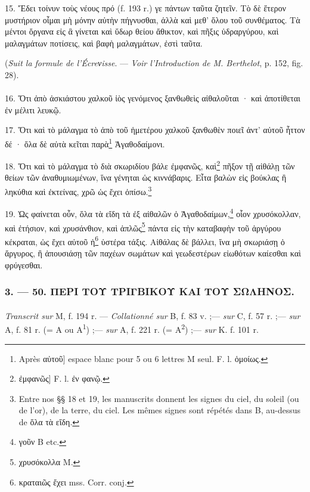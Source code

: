 \documentclass[landscape, a4paper, 11pt, oneside, polutonikogreek, french]{article}
\begin{document}
15. Ἔδει τοίνυν τοὺς νέους πρό (f. 193 r.) γε πάντων ταῦτα ζητεῖν. Τὸ δὲ ἕτερον μυστήριον οἶμαι μὴ μόνην αὐτὴν πήγνυσθαι, ἀλλὰ καὶ μεθ' ὅλου τοῦ συνθέματος. Τὰ μέντοι ὄργανα εἰς ἃ γίνεται καὶ ὕδωρ θείου ἄθικτον, καὶ πῆξις ὑδραργύρου, καὶ μαλαγμάτων ποτίσεις, καὶ βαφὴ μαλαγμάτων, ἐστὶ ταῦτα.
\begin{center}
(\emph{Suit la formule de l'Écreνisse}. --- \emph{Voir l'Introduction de M. Berthelot}, p. 152, fig. 28).
\end{center}
\paragraph{}
16. Ὅτι ἀπὸ ἀσκιάστου χαλκοῦ ἰὸς γενόμενος ξανθωθεὶς αἰθαλοῦται · καὶ ἀποτίθεται ἐν μέλιτι λευκῷ.

17. Ὅτι καὶ τὸ μάλαγμα τὸ ἀπὸ τοῦ ἡμετέρου χαλκοῦ ξανθωθὲν ποιεῖ ἀντ' αὐτοῦ       ἧττον δέ · ὅλα δὲ αὐτὰ κεῖται παρὰ\footnote{Après αὐτοῦ] espace blanc pour 5 ou 6 lettres M seul. F. l. ὁμοίως.} Ἀγαθοδαίμονι.

18. Ὅτι καὶ τὸ μάλαγμα τὸ διὰ σκωριδίου βάλε ἐμφανῶς, καὶ\footnote{ἐμφανῶς] F. l. ἐν φανῷ.} πῆξον τῇ αἰθάλῃ τῶν θείων τῶν ἀναθυμιωμένων, ἵνα γένηται ὡς κιννάβαρις. Εἶτα βαλὼν εἰς βούκλας ἢ ληκύθια καὶ ἐκτείνας, χρῶ ὡς ἔχει ὀπίσω.\footnote{Entre nos §§ 18 et 19, les manuscrits donnent les signes du ciel, du soleil (ou de l'or), de la terre, du ciel. Les mêmes signes sont répétés dans B, au-dessus de ὅλα τὰ εἴδη.}

19. Ὡς φαίνεται οὖν, ὅλα τὰ εἴδη τὰ ἐξ αἰθαλῶν ὁ Ἀγαθοδαίμων,\footnote{γοῦν B etc.} οἷον χρυσόκολλαν, καὶ ἐτήσιον, καὶ χρυσάνθιον, καὶ ἁπλῶς\footnote{χρυσόκολλα M.} πάντα εἰς τὴν καταβαφὴν τοῦ ἀργύρου κέκραται, ὡς ἔχει αὐτοῦ ἡ\footnote{κραταιῶς ἔχει mss. Corr. conj.} ὑστέρα τάξις. Αἰθάλας δὲ βάλλει, ἵνα μὴ σκωριάσῃ ὁ ἄργυρος, ἢ ἀπουσιάσῃ τῶν παχέων σωμάτων καὶ γεωδεστέρων εἰωθότων καίεσθαι καὶ φρύγεσθαι.
\clearpage
\bigskip
\centerline{\EightStarTaper}
\centerline{\EightStarTaper\EightStarTaper}
\bigskip

\subsubsection{3. --- 50. ΠΕΡΙ ΤΟΥ ΤΡΙΓΒΙΚΟΥ ΚΑΙ ΤΟΥ ΣΩΛΗΝΟΣ.}
\paragraph{}
\emph{Transcrit sur} M, f. 194 r. --- \emph{Collationné sur} B, f. 83 v. ;--- \emph{sur} C, f. 57 r. ;--- \emph{sur} A, f. 81 r. (= A ou A\textsuperscript{1}) ;--- \emph{sur} A, f. 221 r. (= A\textsuperscript{2}) ;--- \emph{sur} K. f. 101 r.
\end{document}

